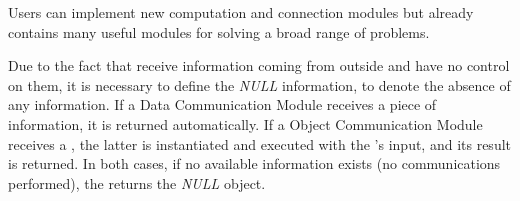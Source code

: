 Users can implement new computation and connection modules but \posl{} already contains many useful modules for solving a broad range of problems.

Due to the fact that \opchs{} receive information coming from outside and have no control on them, it is necessary to define the {\it NULL} information, to denote the absence of any information. If a Data Communication Module receives a piece of information, it is returned automatically. If a Object Communication Module receives a \om{}, the latter is instantiated and executed with the \opch's input, and its result is returned. In both cases, if no available information exists (no communications performed), the \opch{} returns the {\it NULL} object.